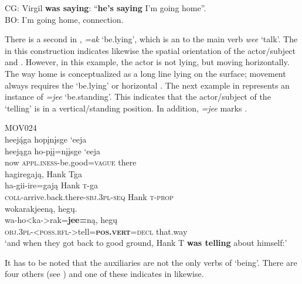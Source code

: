 \documentclass[output=paper]{langsci/langscibook}
\begin{document}
\glt  CG: Virgil \textbf{was saying}: ``\textbf{he's saying} I'm going home''. \\
  BO: I'm going home,   connection.
\z

There is a second  in , \textit{=ak} `be.lying', which is an  to the main verb \textit{wee} `talk'. The  in this construction indicates likewise the spatial orientation of the actor/subject and . However, in this example, the actor is not lying, but moving horizontally. The way home is conceptualized as a long line lying on the surface; movement always requires the `be.lying' or horizontal .
The next example in  represents an instance of \textit{=jee} `be.standing'. This  indicates that the actor/subject of the `telling' is in a vertical/standing position. In addition, \textit{=jee} marks . 

 
\ea\label{ex:helmbrecht:5}
MOV024\\
\glll heej\'{ą}ga hopįnįsge  `eeja \\
  heejąga    ho-pįį=nįįsge        `eeja\\
  now         \textsc{appl}.\textsc{iness}-be.good=\textsc{vague}  there\\

\glll hagiregają, Hank Tga\\
  ha-gii-ire=gają  Hank  \textsc{t}-ga\\
  \textsc{coll}-arrive.back.there-\textsc{sbj}.\textsc{3pl}-\textsc{seq}  Hank  \textsc{t}-\textsc{prop}\\

\glll wokarakjeeną, heg\k{u}.\\
 wa-ho<ka->rak=\textbf{jee=}ną,       heg\k{u}\\
  \textsc{obj}.\textsc{3pl}-<\textsc{poss}.\textsc{rfl}->tell=\textbf{\textsc{pos}.\textsc{vert}}=\textsc{decl}  {that.way}\\
\glt `and when they got back to good ground, Hank T \textbf{was telling} about himself:'
\z

It has to be noted that the  auxiliaries are not the only verbs of `being'. There are four others (see ) and one of these indicates  in  likewise. 
\end{document}
